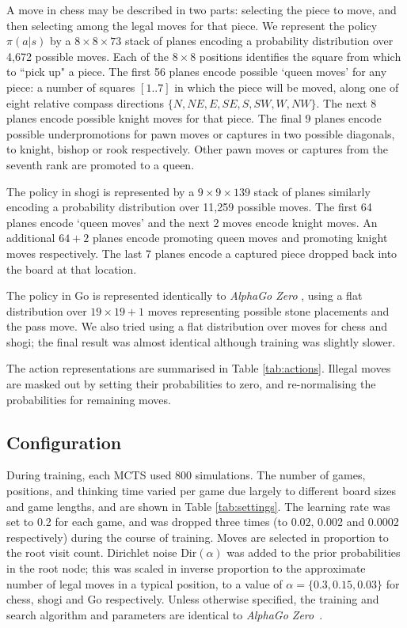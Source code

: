 \documentclass[12pt]{article}
\begin{document}
A move in chess may be described in two parts: selecting the piece to move, and then selecting among the legal moves for that piece. We represent the policy $\pi(a|s)$ by a $8 \times 8 \times 73$ stack of planes encoding a probability distribution over 4,672 possible moves. Each of the $8 \times 8$ positions identifies the square from which to ``pick up" a piece. The first 56 planes encode possible `queen moves' for any piece: a number of squares $[1..7]$ in which the piece will be moved, along one of eight relative compass directions $\{ N,NE,E,SE,S,SW,W,NW \}$. The next 8 planes encode possible knight moves for that piece. The final 9 planes encode possible underpromotions for pawn moves or captures in two possible diagonals, to knight, bishop or rook respectively. Other pawn moves or captures from the seventh rank are promoted to a queen. 

The policy in shogi is represented by a $9 \times 9 \times 139$ stack of planes similarly encoding a probability distribution over 11,259 possible moves. The first 64 planes encode `queen moves' and the next 2 moves encode knight moves. An additional $64 + 2$ planes encode promoting queen moves and promoting knight moves respectively. The last 7 planes encode a captured piece dropped back into the board at that location. 

The policy in Go is represented identically to \emph{AlphaGo Zero} \cite{Silver17AG0}, using a flat distribution over $19 \times 19 + 1$ moves representing possible stone placements and the pass move. 
We also tried using a flat distribution over moves for chess and shogi; the final result was almost identical although training was slightly slower. 

The action representations are summarised in Table \ref{tab:actions}. Illegal moves are masked out by setting their probabilities to zero, and re-normalising the probabilities for remaining moves.

\subsection*{Configuration}

During training, each MCTS used 800 simulations. The number of games, positions, and thinking time varied per game due largely to different board sizes and game lengths, and are shown in Table \ref{tab:settings}. The learning rate was set to 0.2 for each game, and was dropped three times (to 0.02, 0.002 and 0.0002 respectively) during the course of training. Moves are selected in proportion to the root visit count. Dirichlet noise $\text{Dir}(\alpha)$ was added to the prior probabilities in the root node; this was scaled in inverse proportion to the approximate number of legal moves in a typical position, to a value of $\alpha = \{0.3, 0.15, 0.03\}$ for chess, shogi and Go respectively. Unless otherwise specified, the training and search algorithm and parameters are identical to \emph{AlphaGo Zero}~\cite{Silver17AG0}.
\end{document}
